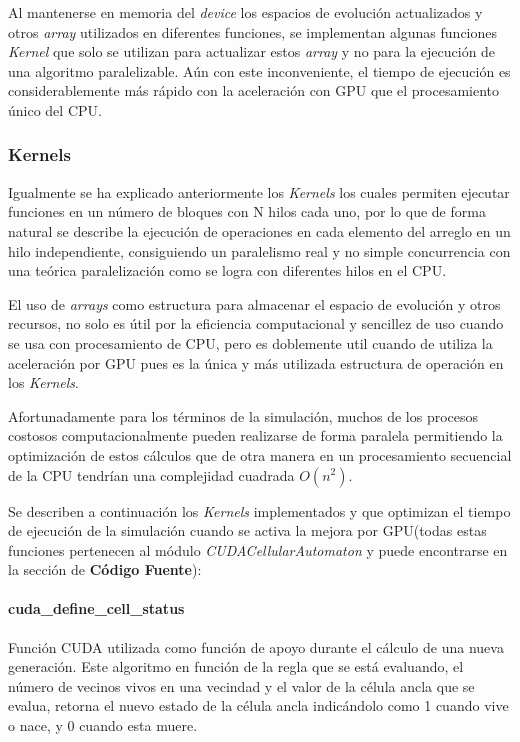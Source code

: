 \documentclass[]{article}
\begin{document}
			Al mantenerse en memoria del \textit{device} los espacios de evolución actualizados y otros \textit{array} utilizados en diferentes funciones, se implementan algunas funciones \textit{Kernel} que solo se utilizan para actualizar estos \textit{array} y no para la ejecución de una algoritmo paralelizable. Aún con este inconveniente, el tiempo de ejecución es considerablemente más rápido con la aceleración con GPU que el procesamiento único del CPU.
		
		\subsubsection{Kernels}
			Igualmente se ha explicado anteriormente los \textit{Kernels} los cuales permiten ejecutar funciones en un número de bloques con N hilos cada uno, por lo que de forma natural se describe la ejecución de operaciones en cada elemento del arreglo en un hilo independiente, consiguiendo un paralelismo real y no simple concurrencia con una teórica paralelización como se logra con diferentes hilos en el CPU.
			
			El uso de \textit{arrays} como estructura para almacenar el espacio de evolución y otros recursos, no solo es útil por la eficiencia computacional y sencillez de uso cuando se usa con procesamiento de CPU, pero es doblemente util cuando de utiliza la aceleración por GPU pues es la única y más utilizada estructura de operación en los \textit{Kernels}.
			
			Afortunadamente para los términos de la simulación, muchos de los procesos costosos computacionalmente pueden realizarse de forma paralela permitiendo la optimización de estos cálculos que de otra manera en un procesamiento secuencial de la CPU tendrían una complejidad cuadrada $O(n^2)$.
			
			Se describen a continuación los \textit{Kernels} implementados y que optimizan el tiempo de ejecución de la simulación cuando se activa la mejora por GPU(todas estas funciones pertenecen al módulo \textit{CUDACellularAutomaton} y puede encontrarse en la sección de \textbf{Código Fuente}):
			
			\paragraph{cuda\_define\_cell\_status}
				Función CUDA utilizada como función de apoyo durante el cálculo de una nueva generación. Este algoritmo en función de la regla que se está evaluando, el número de vecinos vivos en una vecindad y el valor de la célula ancla que se evalua, retorna el nuevo estado de la célula ancla indicándolo como 1 cuando vive o nace, y 0 cuando esta muere.
				
\end{document}
